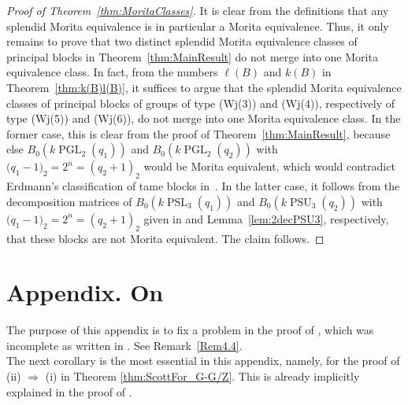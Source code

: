 \documentclass[12pt,a4paper]{amsart}
\theoremstyle{plain}\newtheorem{Theorem}{Theorem}[section]
\theoremstyle{plain}\newtheorem{Conjecture}[Theorem]{Conjecture}
\theoremstyle{plain}\newtheorem{Corollary}[Theorem]{Corollary}
\theoremstyle{plain}\newtheorem{Lemma}[Theorem]{Lemma}
\theoremstyle{plain}\newtheorem{Proposition}[Theorem]{Proposition}
\theoremstyle{definition}\newtheorem{Definition}[Theorem]{Definition}
\theoremstyle{definition}\newtheorem{Example}[Theorem]{Example}
\theoremstyle{definition}\newtheorem{Examples}[Theorem]{Examples}
\theoremstyle{definition}\newtheorem{Remark}[Theorem]{Remark}
\theoremstyle{definition}\newtheorem{Question}[Theorem]{Question}
\theoremstyle{definition}\newtheorem{Notation}[Theorem]{Notation}
\theoremstyle{definition}\newtheorem{Hypothesis}[Theorem]{Hypothesis}
\theoremstyle{definition}\newtheorem{Assumption}[Theorem]{Assumption}
\theoremstyle{definition}\newtheorem{Strategy}[Theorem]{Strategy}
\theoremstyle{definition}\newtheorem{Contents}[Theorem]{Contents}
\theoremstyle{definition}\newtheorem{Computations}[Theorem]{Computations}
\theoremstyle{definition}\newtheorem{Equivalences}[Theorem]{Equivalences}
\theoremstyle{definition}\newtheorem{Notation/Definition}[Theorem]{Notation/Definition}
\theoremstyle{definition}\newtheorem{noth}[Theorem]{}
\theoremstyle{plain}\newtheorem{Step}[Theorem]{Step}
\newcommand{\PSL}{\operatorname{PSL}}
\newcommand{\PGL}{\operatorname{PGL}}
\newcommand{\PSU}{\operatorname{PSU}}
\begin{document}
\begin{proof}[Proof of Theorem~\ref{thm:MoritaClasses}]
It is clear from the definitions that any splendid Morita equivalence is in particular a Morita equivalence. Thus, it only remains to prove that two distinct splendid Morita equivalence classes of principal blocks in Theorem~\ref{thm:MainResult} do not merge into one Morita equivalence class.  In fact,  from the numbers $\ell(B)$ and $k(B)$ in Theorem~\ref{thm:k(B)l(B)}, it suffices to argue that the splendid Morita equivalence classes of principal blocks of groups of type {\sf (Wj(3))} and {\sf (Wj(4))}, respectively of type {\sf (Wj(5))} and {\sf (Wj(6))}, do not merge into one Morita equivalence class. 
In the former case, this is clear from the proof of Theorem~\ref{thm:MainResult}, because else $B_0(k\PGL_2(q_1))$ and $B_0(k\PGL_2(q_2))$  with $({q_1-1)_2=2^n=(q_2+1)_2}$ would be Morita equivalent, which would contradict Erdmann's classification of tame blocks in~\cite{Erd90}.
In the latter case, it follows from the decomposition matrices of $B_0(k\PSL_3(q_1))$ and $B_0(k\PSU_3(q_2))$  with $({q_1-1)_2=2^n=(q_2+1)_2}$ given in \cite[Proposition~6.12]{Sch15} and Lemma~\ref{lem:2decPSU3}, respectively, that these blocks are not Morita equivalent. The claim follows. 
\end{proof}





\appendix 

\section{Appendix. On  \cite[Proposition 3.3(b)]{KL20b} }\label{App:A}%

The purpose of this appendix  is to fix a problem in the proof of \cite[Proposition~3.3(b)]{KL20b},
which was incomplete as written in \cite{KL20b}.  See Remark~\ref{Rem4.4}. \\

The next corollary is  the most essential in this appendix, namely, for the proof of 
(ii) $\Rightarrow$ (i) in Theorem \ref{thm:ScottFor_G-G/Z}.
This is already implicitly explained in the proof of \cite[Theorem 9.7.4]{Lin18}.
\end{document}
